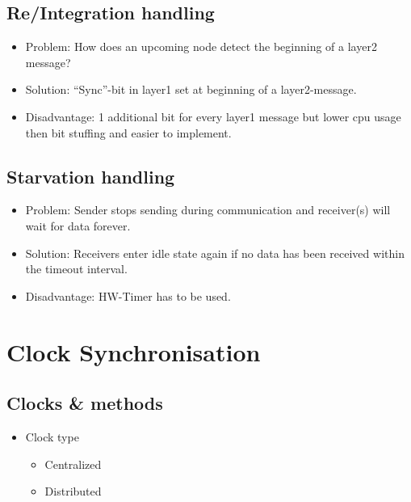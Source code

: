 \subsection{Re/Integration handling}
\begin{center}
\begin{itemize}
 \item \begin{large}Problem: How does an upcoming node detect the beginning of a layer2 message?\end{large}
 \item \begin{large}Solution: ``Sync''-bit in layer1 set at beginning of a layer2-message.\end{large}
 \item \begin{large}Disadvantage: 1 additional bit for every layer1 message but lower cpu usage then bit stuffing and easier to implement.\end{large}
\end{itemize}
\end{center}


\subsection{Starvation handling}
\begin{center}
\begin{itemize}
 \item \begin{large}Problem: Sender stops sending during communication and receiver(s) will wait for data forever.\end{large}
 \item \begin{large}Solution: Receivers enter idle state again if no data has been received within the timeout interval.\end{large}
 \item \begin{large}Disadvantage: HW-Timer has to be used.\end{large}
\end{itemize}
\end{center}


\section{Clock Synchronisation}
\subsection{Clocks \& methods}
  \begin{center}
  \begin{itemize}
    \item \begin{large}Clock type\end{large}
    \begin{itemize}
      \item Centralized
      \item Distributed
    \end{itemize}
  \end{itemize}
  \end{center}


